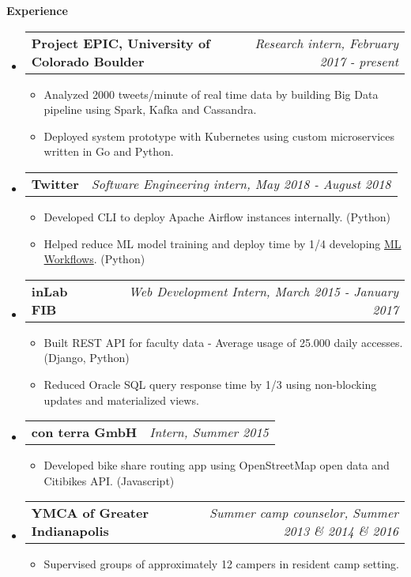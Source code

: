 \documentclass[letterpaper,10pt]{article}
\makeatletter
\newcommand{\resitem}[1]{\item #1 \vspace{-2pt}}
\newcommand{\resheading}[1]{{\large \colorbox{mygrey}{\begin{minipage}{\textwidth}{\textbf{#1 \vphantom{p\^{E}}}}\end{minipage}}}}
\newcommand{\ressubheading}[4]{
\begin{tabular*}{7.0in}{l@{\extracolsep{\fill}}r}
		\textbf{#1} & \textit{#4} \\
\end{tabular*}\vspace{-6pt}}
\makeatother
\begin{document}
\resheading{Experience}
\begin{itemize}
	\item
	\ressubheading{Project EPIC, University of Colorado Boulder}{Boulder, CO}{Research intern}{Research intern, February 2017 - present}
	\begin{itemize}
		\item Analyzed 2000 tweets/minute of real time data by building Big Data pipeline using Spark, Kafka and Cassandra. 
		\item Deployed system prototype with Kubernetes using custom microservices written in Go and Python.
	\end{itemize}
	\item
	\ressubheading{Twitter}{Boulder, CO}{Software Engineering intern}{Software Engineering intern, May 2018 - August 2018}
	\begin{itemize}
		\item Developed CLI to deploy Apache Airflow instances internally. (Python)
		\item Helped reduce ML model training and deploy time by 1/4 developing \href{https://blog.twitter.com/engineering/en_us/topics/insights/2018/ml-workflows.html}{ML Workflows}. (Python)
	\end{itemize}
\item
	\ressubheading{inLab FIB}{Barcelona, Spain}{Web Development Intern}{Web Development Intern, March 2015 - January 2017}
	\begin{itemize}
		\resitem{Built REST API for faculty data - Average usage of 25.000 daily accesses. (Django, Python)}
  		\resitem{Reduced Oracle SQL query response time by 1/3 using non-blocking updates and materialized views.}
	\end{itemize}

\item
	\ressubheading{con terra GmbH}{Münster, Germany}{Intern}{Intern, Summer 2015}
	\begin{itemize}
		\resitem{Developed bike share routing app using OpenStreetMap open data and Citibikes API. (Javascript)}
	\end{itemize}
\item
	\ressubheading{YMCA of Greater Indianapolis}{St. Paul, IN}{Summer camp counselor}{Summer camp counselor, Summer 2013 \& 2014 \& 2016}
		\begin{itemize}
		\resitem{Supervised groups of approximately 12 campers in resident camp setting.}
	\end{itemize}
\end{itemize}
\end{document}
